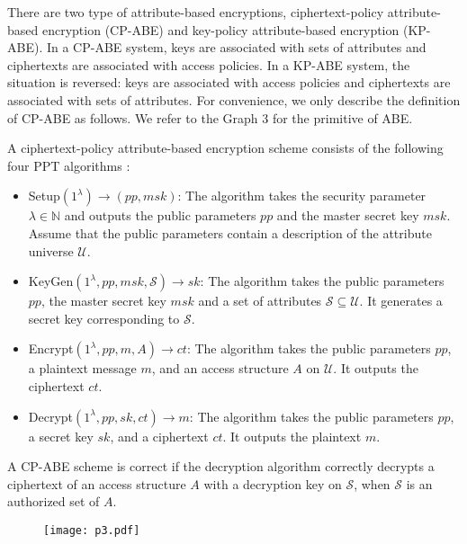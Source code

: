 \documentclass[11pt]{article}
\begin{document}
There are two type of attribute-based encryptions, ciphertext-policy attribute-based encryption
(CP-ABE) and key-policy attribute-based encryption (KP-ABE). In a CP-ABE system, keys are associated with sets of attributes and ciphertexts are associated with
access policies. In a KP-ABE system, the situation is reversed: keys are associated with access
policies and ciphertexts are associated with sets of attributes.
 For convenience, we only describe the definition of CP-ABE as follows.
We refer to the Graph 3 for the primitive  of ABE.


A ciphertext-policy attribute-based encryption scheme consists of the following four PPT algorithms \cite{RW12}:
\begin{itemize}
\item[] \textsf{Setup}$(1^{\lambda}) \rightarrow  (pp, msk)$: The algorithm takes the security parameter $ \lambda \in \mathbb{N} $  and outputs the public parameters $pp$ and the master secret key $msk$. Assume that the public parameters
contain a description of the attribute universe $\mathcal{U}$.

\item[]   \textsf{KeyGen}$(1^{\lambda}, pp, msk, \mathcal{S}) \rightarrow sk$: The algorithm takes  the public parameters $pp$,
the master secret key $msk$ and a set of attributes $\mathcal{S} \subseteq \mathcal{U}$.  It generates a secret key corresponding to $\mathcal{S}$.

\item[]  \textsf{Encrypt}$(1^{\lambda}, pp, m, A)\rightarrow ct$: The  algorithm takes the public parameters $pp$, a
plaintext message $m$, and an access structure $A$ on $\mathcal{U}$. It outputs the ciphertext $ct$.

\item[]
  \textsf{Decrypt}$(1^{\lambda}, pp, sk, ct) \rightarrow m$: The algorithm takes  the public parameters $pp$, a
secret key $sk$, and a ciphertext $ct$. It outputs the plaintext $m$.
\end{itemize}

A CP-ABE scheme is correct if the decryption algorithm correctly
decrypts a ciphertext of an access structure $A$ with a decryption key on $\mathcal{S}$, when $\mathcal{S}$ is an authorized set of $A$.

\begin{figure}[htbp]
\begin{minipage}[t]{.9\textwidth}
\hspace*{20mm}\texttt{[image: p3.pdf]}
  \end{minipage}
\end{figure}
\end{document}

